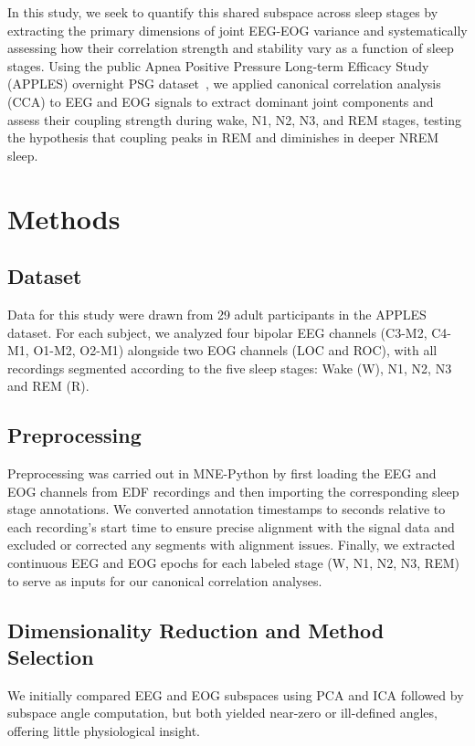 In this study, we seek to quantify this shared subspace across sleep stages by extracting the primary dimensions of joint EEG-EOG variance and systematically assessing how their correlation strength and stability vary as a function of sleep stages. Using the public Apnea Positive Pressure Long-term Efficacy Study (APPLES) overnight PSG dataset~\cite{mueller_nsrr}, we applied canonical correlation analysis (CCA) to EEG and EOG signals to extract dominant joint components and assess their coupling strength during wake, N1, N2, N3, and REM stages, testing the hypothesis that coupling peaks in REM and diminishes in deeper NREM sleep.
 
\section{Methods}

\subsection{Dataset}

Data for this study were drawn from 29 adult participants in the APPLES dataset. For each subject, we analyzed four bipolar EEG channels (C3-M2, C4-M1, O1-M2, O2-M1) alongside two EOG channels (LOC and ROC), with all recordings segmented according to the five sleep stages: Wake (W), N1, N2, N3 and REM (R).

\subsection{Preprocessing}

Preprocessing was carried out in MNE-Python by first loading the EEG and EOG channels from EDF recordings and then importing the corresponding sleep stage annotations. We converted annotation timestamps to seconds relative to each recording's start time to ensure precise alignment with the signal data and excluded or corrected any segments with alignment issues. Finally, we extracted continuous EEG and EOG epochs for each labeled stage (W, N1, N2, N3, REM) to serve as inputs for our canonical correlation analyses.

\subsection{Dimensionality Reduction and Method Selection}

We initially compared EEG and EOG subspaces using PCA and ICA followed by subspace angle computation, but both yielded near-zero or ill-defined angles, offering little physiological insight. 

